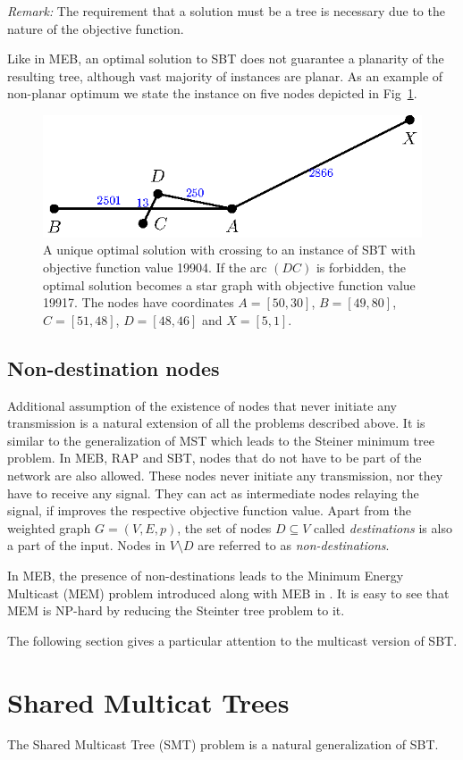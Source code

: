\emph{Remark:} The requirement that a solution must be a tree is necessary due to the nature of the objective function.

Like in MEB, an optimal solution to SBT does not guarantee a planarity of the resulting tree, although vast majority of instances are planar. 
As an example of non-planar optimum we state the instance on five nodes depicted in Fig~\ref{fig:sbtnonplanar}.
\begin{figure}[htb!]
  \centering
  \includegraphics[scale=1.4]{figurer/sbtnonplanar.eps}
  \caption{A unique optimal solution with crossing to an instance of SBT with objective function value 19904. 
  If the arc $(DC)$ is forbidden, the optimal solution becomes a star graph with objective function value 19917.
  The nodes have coordinates $A=[50,30]$, $B=[49,80]$, $C=[51,48]$, $D=[48,46]$ and $X=[5,1]$.}
  \label{fig:sbtnonplanar}
\end{figure}

\subsection{Non-destination nodes}

Additional assumption of the existence of nodes that never initiate any transmission is a natural extension of all the problems described above.
It is similar to the generalization of MST which leads to the Steiner minimum tree problem.
In MEB, RAP and SBT, nodes that do not have to be part of the network are also allowed. 
These nodes never initiate any transmission, nor they have to receive any signal.
They can act as intermediate nodes relaying the signal, if improves the respective objective function value.
Apart from the weighted graph $G=(V,E,p)$, the set of nodes $D\subseteq V$ called \emph{destinations} is also a part of the input.
Nodes in $V\setminus D$ are referred to as \emph{non-destinations}.

In MEB, the presence of non-destinations leads to the Minimum Energy Multicast (MEM) problem introduced along with MEB in \cite{wieselthier00}.
It is easy to see that MEM is NP-hard by reducing the Steinter tree problem to it.


The following section gives a particular attention to the multicast version of SBT.

\section{Shared Multicat Trees}

The Shared Multicast Tree (SMT) problem is a natural generalization of SBT.
